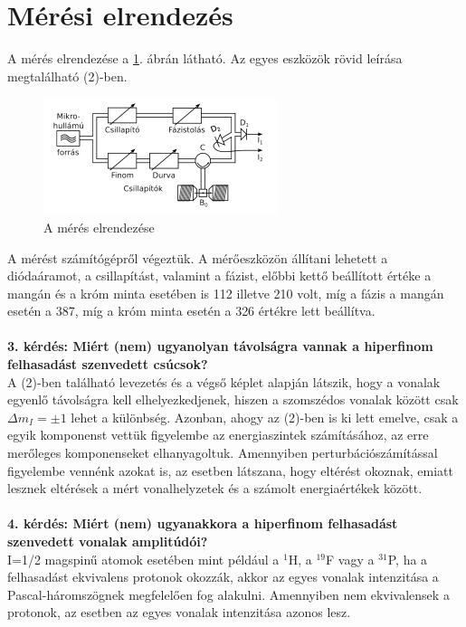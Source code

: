 \documentclass[12pt,a4paper]{article}
\begin{document}
\section{Mérési elrendezés}
\hspace*{10pt} A mérés elrendezése a \ref{im-1}. ábrán látható. Az egyes eszközök rövid leírása megtalálható (2)-ben.\\
\begin{figure}[!h]
\centering
\includegraphics[scale=3]{elrend}
\caption{A mérés elrendezése}
\label{im-1}
\end{figure}
\newline
A mérést számítógépről végeztük. A mérőeszközön állítani lehetett a diódaáramot, a csillapítást, valamint a fázist, előbbi kettő beállított értéke a mangán és a króm minta esetében is 112 illetve 210 volt, míg a fázis a mangán esetén a 387, míg a króm minta esetén a 326 értékre lett beállítva.\\
\\
\textbf{3. kérdés: Miért (nem) ugyanolyan távolságra vannak a hiperfinom felhasadást szenvedett csúcsok?}\\
A (2)-ben található levezetés és a végső képlet alapján látszik, hogy a  vonalak egyenlő távolságra kell elhelyezkedjenek, hiszen a szomszédos vonalak között csak $\Delta m_I=\pm 1$ lehet a különbség. Azonban, ahogy az (2)-ben is ki lett emelve, csak a egyik komponenst vettük figyelembe az energiaszintek számításához, az erre merőleges komponenseket elhanyagoltuk. Amennyiben perturbációszámítással figyelembe vennénk azokat is, az esetben látszana, hogy eltérést okoznak, emiatt lesznek eltérések a mért vonalhelyzetek és a számolt energiaértékek között.\\
\\
\textbf{4. kérdés: Miért (nem) ugyanakkora a hiperfinom felhasadást szenvedett vonalak amplitúdói?}\\
I=1/2 magspinű atomok esetében mint például a $^1$H, a $^{19}$F vagy a $^{31}$P, ha a felhasadást ekvivalens protonok okozzák, akkor az egyes vonalak intenzitása a Pascal-háromszögnek megfelelően fog alakulni. Amennyiben nem ekvivalensek a protonok, az esetben az egyes vonalak intenzitása azonos lesz.\\
\end{document}
